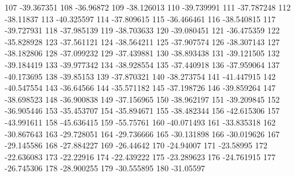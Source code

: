 107                      -39.367351
108                       -36.96872
109                      -38.126013
110                      -39.739991
111                      -37.787248
112                       -38.11837
113                      -40.325597
114                      -37.809615
115                      -36.466461
116                      -38.540815
117                      -39.727931
118                      -37.985139
119                      -38.703633
120                      -39.080451
121                      -36.475359
122                      -35.828928
123                      -37.561121
124                      -38.564211
125                      -37.907574
126                      -38.307143
127                      -38.182806
128                      -37.099232
129                      -37.439881
130                      -38.893438
131                      -39.121505
132                      -39.184419
133                      -39.977342
134                      -38.928554
135                      -37.440918
136                      -37.959064
137                      -40.173695
138                       -39.85153
139                      -37.870321
140                      -38.273754
141                      -41.447915
142                      -40.547554
143                       -36.64566
144                      -35.571182
145                      -37.198726
146                      -39.859264
147                      -38.698523
148                      -36.900838
149                      -37.156965
150                      -38.962197
151                      -39.209845
152                      -36.905446
153                      -35.453707
154                      -35.894671
155                      -38.482344
156                      -42.615306
157                      -43.991611
158                      -45.636415
159                       -55.75761
160                      -40.071493
161                      -33.835318
162                      -30.867643
163                      -29.728051
164                      -29.736666
165                      -30.131898
166                      -30.019626
167                      -29.145586
168                      -27.884227
169                       -26.44642
170                       -24.94007
171                       -23.58995
172                      -22.636083
173                       -22.22916
174                      -22.439222
175                      -23.289623
176                      -24.761915
177                      -26.745306
178                      -28.900255
179                      -30.555895
180                       -31.05597

